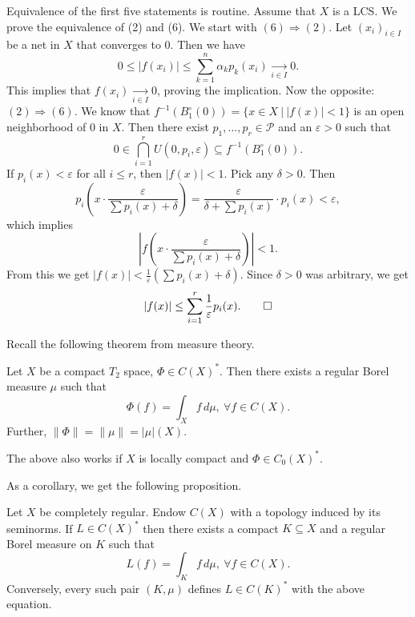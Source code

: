 \begin{myproof}
  Equivalence of the first five statements is routine.
  Assume that $X$ is a LCS. We prove the equivalence of (2) and (6).
  We start with $(6) \Rightarrow (2)$. Let $(x_i)_{i \in I}$ be a net in $X$ that converges to $0$.
  Then we have 
  $$0 \leq |f(x_i)| \leq \sum_{k = 1} ^n \alpha_k p_k(x_i) \xrightarrow[i \in I]{} 0.$$
  This implies that $f(x_i) \xrightarrow[i \in I]{} 0$, proving the implication.
  Now the opposite: $(2) \Rightarrow (6)$.
  We know that $f^{-1} ( B_1 ^\circ (0)) = \{x \in X\ |\ |f(x)| < 1\}$
  is an open neighborhood of $0$ in $X$. Then there exist $p_1, \dots, p_r \in \mathcal{P}$
  and an $\varepsilon > 0$ such that 
  $$0 \in \bigcap_{i = 1} ^r U(0, p_i, \varepsilon) \subseteq f^{-1} (B_1 ^\circ (0)).$$
  If $p_i(x) < \varepsilon$ for all $i \leq r$, then $|f(x)| < 1.$ Pick any $\delta > 0$.
  Then $$p_i \left(x \cdot \frac{\varepsilon}{\sum p_i (x) + \delta}\right) = \frac{\varepsilon}{\delta + \sum p_i (x)} \cdot p_i (x) < \varepsilon,$$
  which implies 
  $$\left| f\left(x \cdot \frac{\varepsilon}{\sum p_i (x) + \delta}\right) \right| < 1.$$
  From this we get 
  $|f(x)| < \frac{1}{\varepsilon} \left(\sum p_i (x) + \delta\right)$.
  Since $\delta > 0$ was arbitrary, we get
  \begin{equation*}
    |f(x)| \leq \sum_{i = 1} ^r \frac{1}{\varepsilon} p_i(x). \qedhere 
  \end{equation*}
\end{myproof}

Recall the following theorem from measure theory.

\begin{theorem}
  Let $X$ be a compact $T_2$ space, $\Phi \in C(X)^*$.
  Then there exists a regular Borel measure $\mu$ such that 
  $$\Phi (f) = \int_X f\, d\mu,\ \forall f \in C(X).$$
  Further, $\| \Phi\| = \|\mu\| = |\mu| (X)$.
\end{theorem}

\begin{remark}
  The above also works if $X$ is locally compact and $\Phi \in C_0(X)^*$.
\end{remark}

As a corollary, we get the following proposition.

\begin{proposition}
  Let $X$ be completely regular. Endow $C(X)$ with a topology induced by its seminorms.
  If $L \in C(X)^{*}$ then there exists a compact $K \subseteq X$ and a regular Borel measure on $K$ such that 
  $$L(f) = \int_{K} f\, d\mu,\ \forall f \in C(X).$$
  Conversely, every such pair $(K, \mu)$ defines $L \in C(K)^*$ with the above equation.
\end{proposition}

